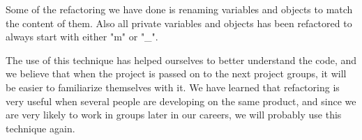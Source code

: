 Some of the refactoring we have done is renaming variables and objects to match the content of them. Also all private variables and objects has been refactored to always start with either "m" or "\_".

The use of this technique has helped ourselves to better understand the code, and we believe that when the project is passed on to the next project groups, it will be easier to familiarize themselves with it. We have learned that refactoring is very useful when several people are developing on the same product, and since we are very likely to work in groups later in our careers, we will probably use this technique again.